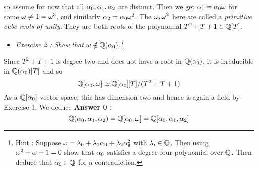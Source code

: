 \documentclass{article}
\begin{document}
so assume for now that all $\alpha_0 , \alpha_1 , \alpha_2$ are distinct.
Then we get $\alpha_1 = \alpha_0 \omega$ for some $\omega \neq 1 = \omega^3$,
and similarly $\alpha_2 = \alpha_0 \omega^2$.
The $\omega, \omega^2$ here are called a \emph{primitive cube roots of unity}.
They are both roots of the polynomial $T^2 + T + 1 \in \mathbb{Q}[T]$.
\begin{itemize}
  \item \textit{Exercise 2 : Show that $\omega \notin \mathbb{Q}(\alpha_0)$.\footnote{
    Hint : Suppose $\omega = \lambda_0 + \lambda_1 \alpha_0 + \lambda_2 \alpha_0^2$
    with $\lambda_i \in \mathbb{Q}$. Then using $\omega^2 + \omega + 1 = 0$
    show that $\alpha_0$ satisfies a degree four polynomial over $\mathbb{Q}$.
    Then deduce that $\alpha_0 \in \mathbb{Q}$ for a contradiction.
  }}
\end{itemize}
Since $T^2 + T + 1$ is degree two and does not have a root in $\mathbb{Q}(\alpha_0)$,
it is irreducible in $\mathbb{Q}(\alpha_0)[T]$
and so \[
  \mathbb{Q}[\alpha_0 , \omega] \simeq \mathbb{Q}[\alpha_0][T] / (T^2 + T + 1)
\]
As a $\mathbb{Q}[\alpha_0]$-vector space, this has dimension two and
hence is again a field by Exercise 1. 
We deduce 
\textbf{Answer 0 :} \[
  \mathbb{Q}(\alpha_0 , \alpha_1 , \alpha_2) = \mathbb{Q}[\alpha_0 , \omega] = \mathbb{Q}[\alpha_0 , \alpha_1 ,\alpha_2]
\]
\end{document}

